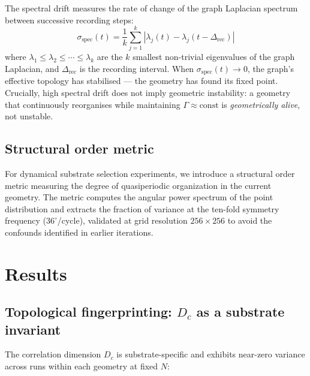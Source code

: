 \documentclass[12pt,a4paper]{article}
\theoremstyle{plain}
\theoremstyle{definition}
\begin{document}
The spectral drift measures the rate of change of the graph Laplacian
spectrum between successive recording steps:
\begin{equation}
\sigma_{\text{spec}}(t) = \frac{1}{k}\sum_{j=1}^{k}
  |\lambda_j(t) - \lambda_j(t - \Delta_{\text{rec}})|
\end{equation}
where $\lambda_1 \leq \lambda_2 \leq \cdots \leq \lambda_k$ are the
$k$ smallest non-trivial eigenvalues of the graph Laplacian, and
$\Delta_{\text{rec}}$ is the recording interval. When
$\sigma_{\text{spec}}(t) \to 0$, the graph's effective topology has
stabilised --- the geometry has found its fixed point. Crucially, high
spectral drift does not imply geometric instability: a geometry that
continuously reorganises while maintaining $\Gamma \approx \text{const}$
is \emph{geometrically alive}, not unstable.

\subsection{Structural order metric}

For dynamical substrate selection experiments, we introduce a structural
order metric measuring the degree of quasiperiodic organization in the
current geometry. The metric computes the angular power spectrum of the
point distribution and extracts the fraction of variance at the
ten-fold symmetry frequency ($36^\circ$/cycle), validated at grid
resolution $256 \times 256$ to avoid the confounds identified in earlier
iterations.

\section{Results}
\label{sec:results}

\subsection{Topological fingerprinting: $D_c$ as a substrate invariant}

The correlation dimension $D_c$ is substrate-specific and exhibits
near-zero variance across runs within each geometry at fixed $N$:
\end{document}
